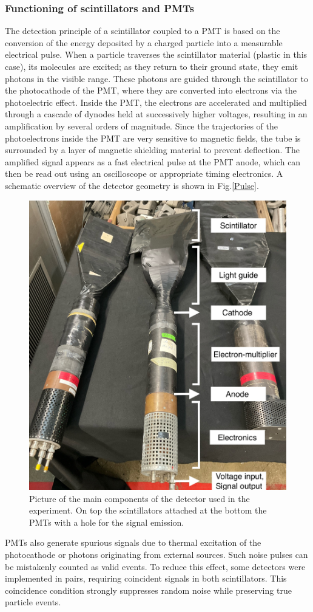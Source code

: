 \documentclass[11pt,a4paper]{article}
\begin{document}
\subsubsection{Functioning of scintillators and PMTs}
The detection principle of a scintillator coupled to a PMT is based on the conversion of the energy deposited by a charged particle into a measurable electrical pulse. When a particle traverses the scintillator material (plastic in this case), its molecules are excited; as they return to their ground state, they emit photons in the visible range. These photons are guided through the scintillator to the photocathode of the PMT, where they are converted into electrons via the photoelectric effect. Inside the PMT, the electrons are accelerated and multiplied through a cascade of dynodes held at successively higher voltages, resulting in an amplification by several orders of magnitude. Since the trajectories of the photoelectrons inside the PMT are very sensitive to magnetic fields, the tube is surrounded by a layer of magnetic shielding material to prevent deflection. The amplified signal appears as a fast electrical pulse at the PMT anode, which can then be read out using an oscilloscope or appropriate timing electronics.
A schematic overview of the detector geometry is shown in Fig.\ref{Pulse}.
\begin{figure}[h]
    \centering
    \includegraphics[width=0.45\linewidth]{Detector.jpeg}
    \caption{Picture of the main components of the detector used in the experiment. On top the scintillators attached at the bottom the PMTs with a hole for the signal emission.}
    \label{piM1}
\end{figure}

PMTs also generate spurious signals due to thermal excitation of the photocathode or photons originating from external sources. Such noise pulses can be mistakenly counted as valid events. To reduce this effect, some detectors were implemented in pairs, requiring coincident signals in both scintillators. This coincidence condition strongly suppresses random noise while preserving true particle events.
\end{document}
